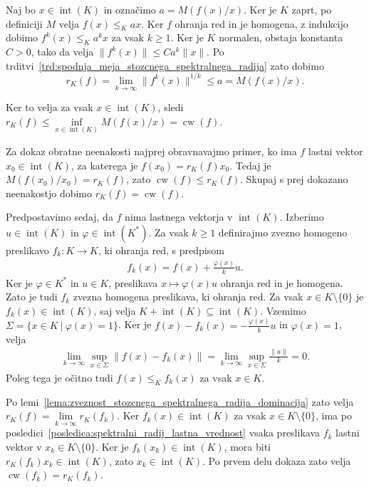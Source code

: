 \documentclass[mat2, tisk]{fmfdelo}
\begin{document}
\begin{dokaz} 
  Naj bo $x\in\operatorname{int}(K)$ in označimo
  $a=M(f(x)/x)$. Ker je $K$ zaprt, po definiciji $M$
  velja $f(x)\leq_K ax$. Ker $f$ ohranja red in je
  homogena, z indukcijo dobimo $f^k(x)\leq_K a^k x$
  za vsak $k\geq1$. Ker je $K$ normalen, obstaja
  konstanta $C>0$, tako da velja
  $\|f^k(x)\|\leq Ca^k\|x\|$.
  Po trditvi~\ref{trd:spodnja_meja_stozcnega_spektralnega_radija}
  zato dobimo
  \[
  r_K(f)=\lim\limits_{k\to\infty}\|f^k(x)\|^{1/k}
  \leq a=M(f(x)/x).
  \]

  Ker to velja za vsak $x\in\operatorname{int}(K)$, sledi
  $r_K(f)\leq\inf\limits_{x\in\operatorname{int}(K)}M(f(x)/x)
  =\operatorname{cw}(f)$.

  Za dokaz obratne neenakosti najprej obravnavajmo primer, ko ima $f$
  lastni vektor $x_0\in\operatorname{int}(K)$, za katerega je
  $f(x_0)=r_K(f)x_0$. Tedaj je
  $M(f(x_0)/x_0)=r_K(f)$, zato
  $\operatorname{cw}(f)\leq r_K(f)$. Skupaj s prej dokazano neenakostjo
  dobimo $r_K(f)=\operatorname{cw}(f)$.

  Predpostavimo sedaj, da $f$ nima lastnega vektorja v
  $\operatorname{int}(K)$. Izberimo $u\in\operatorname{int}(K)$ in
  $\varphi\in\operatorname{int}(K^*)$. Za vsak $k\geq1$ definirajmo
  zvezno homogeno preslikavo $f_k\colon K\longrightarrow K$, ki ohranja
  red, s predpisom
  \begin{align*}
  f_k(x)=f(x)+\frac{\varphi(x)}{k}u.
  \end{align*}
  Ker je $\varphi\in K^*$ in $u\in K$, preslikava
  $x\mapsto\varphi(x)u$ ohranja red in je homogena.
  Zato je tudi $f_k$ zvezna homogena preslikava,
  ki ohranja red.
  Za vsak $x\in K\setminus\{0\}$ je
  $f_k(x)\in\operatorname{int}(K)$, saj velja $K+\operatorname{int}(K)\subseteq\operatorname{int}(K)$. 
  Vzemimo $\Sigma=\{x\in K ~|~ \varphi(x)=1\}$. Ker je $f(x)-f_k(x) = -\frac{\varphi(x)}{k}u$ in $\varphi(x)=1$, velja
  \begin{align*}
  \lim\limits_{k\to\infty}
  \sup_{x\in\Sigma}\|f(x)-f_k(x)\|= \lim\limits_{k\to\infty} \sup_{x\in\Sigma} \frac{\|u\|}{k} = 0.
  \end{align*}
  Poleg tega je očitno tudi 
  $f(x)\leq_K f_k(x)$ za vsak $x\in K$.

  Po lemi~\ref{lema:zveznost_stozcnega_spektralnega_radija_dominacija}
  zato velja
  $r_K(f)=\lim\limits_{k\to\infty}r_K(f_k)$.
  Ker $f_k(x)\in\operatorname{int}(K)$ za vsak $x\in K\setminus\{0\}$,
  ima po posledici~\ref{posledica:spektralni_radij_lastna_vrednost} vsaka preslikava $f_k$ lastni vektor v
  $x_k\in K\setminus\{0\}$. Ker je $f_k(x_k)\in\operatorname{int}(K)$, mora biti 
  $r_K(f_k) x_k \in \operatorname{int}(K)$, zato $x_k\in\operatorname{int}(K)$. 
  Po prvem delu dokaza zato velja $\operatorname{cw}(f_k)=r_K(f_k)$.


\end{dokaz}
\end{document}
